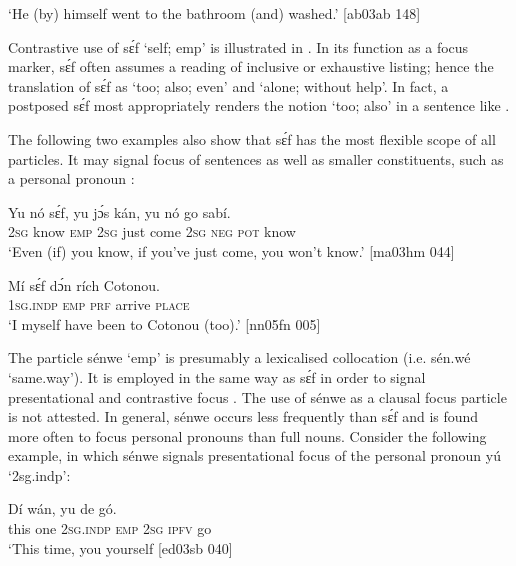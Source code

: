 \glt ‘He (by) himself went to the bathroom (and) washed.’ [ab03ab 148]
\z

Contrastive use of sɛ́f ‘self; emp’ is illustrated in . In its function as a focus marker, sɛ́f often assumes a reading of inclusive or exhaustive listing; hence the translation of sɛ́f as ‘too; also; even’ and ‘alone; without help’. In fact, a postposed sɛ́f most appropriately renders the notion ‘too; also’ in a sentence like . {\fff}


The following two examples also show that sɛ́f has the most flexible scope of all particles. It may signal focus of sentences  as well as smaller constituents, such as a personal pronoun : 



\ea%
    \label{ex:key:666}
    \gll Yu  nó    sɛ́f,  yu  jɔ́s  kán,    yu  nó  go  sabí.\\
\textsc{2sg}  know  \textsc{emp}  \textsc{2sg}  just  come  \textsc{2sg}  \textsc{neg}  \textsc{pot}  know  \\

\glt ‘Even (if) you know, if you’ve just come, you won’t know.’ [ma03hm 044]
\z


\ea%
    \label{ex:key:667}
    \gll Mí    sɛ́f  dɔ́n  rích    Cotonou.\\
\textsc{1sg.indp}  \textsc{emp}  \textsc{prf}  arrive  \textsc{place}\\

\glt ‘I myself have been to Cotonou (too).’ [nn05fn 005]
\z

The particle sénwe ‘emp’ is presumably a lexicalised collocation (i.e. sén.wé ‘same.way’). It is employed in the same way as sɛ́f in order to signal presentational and contrastive focus{\fff} . The use of sénwe as a clausal focus particle is not attested. In general, sénwe occurs less frequently than sɛ́f and is found more often to focus personal pronouns than full nouns. Consider the following example, in which sénwe signals presentational focus of the personal pronoun yú ‘2sg.indp’: 


\ea%
    \label{ex:key:668}
    \gll Dí  wán,       yu  de  gó.\\
this  one    \textsc{2sg.indp}  \textsc{emp}    \textsc{2sg}  \textsc{ipfv}  go\\

\glt ‘This time, you yourself  [ed03sb 040]
\z

